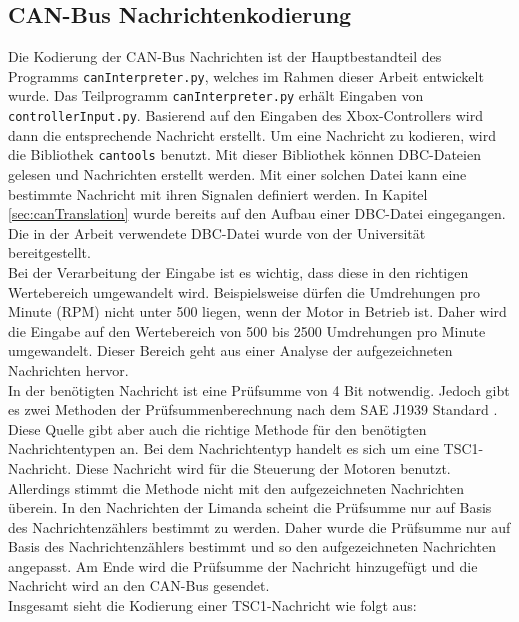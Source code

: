 \subsection{CAN-Bus Nachrichtenkodierung} \label{sec:canBus}
Die Kodierung der CAN-Bus Nachrichten ist der Hauptbestandteil des Programms \texttt{canInterpreter.py}, welches im Rahmen dieser Arbeit
entwickelt wurde. 
Das Teilprogramm \texttt{canInterpreter.py} erhält Eingaben von \texttt{controllerInput.py}. Basierend auf den
Eingaben des Xbox-Controllers wird dann die entsprechende Nachricht erstellt. Um eine Nachricht zu kodieren, wird die Bibliothek \texttt{cantools} benutzt.
Mit dieser Bibliothek können DBC-Dateien gelesen und Nachrichten erstellt werden. Mit einer solchen Datei kann eine
bestimmte Nachricht mit ihren Signalen definiert werden. In Kapitel \ref{sec:canTranslation} wurde bereits auf den
Aufbau einer DBC-Datei eingegangen. Die in der Arbeit verwendete DBC-Datei wurde von der Universität bereitgestellt. \\
Bei der Verarbeitung der Eingabe ist es wichtig, dass diese in den richtigen Wertebereich umgewandelt wird.
Beispielsweise dürfen die Umdrehungen pro Minute (RPM) nicht unter 500 liegen, wenn der Motor in Betrieb ist.
Daher wird die Eingabe auf den Wertebereich von 500 bis 2500 Umdrehungen pro Minute umgewandelt. Dieser Bereich
geht aus einer Analyse der aufgezeichneten Nachrichten hervor.
\\
In der benötigten Nachricht ist eine Prüfsumme von 4 Bit notwendig. Jedoch gibt es zwei Methoden der Prüfsummenberechnung
nach dem SAE J1939 Standard \cite{VectorSAE}. Diese Quelle gibt aber auch die richtige Methode für den benötigten Nachrichtentypen
an. Bei dem Nachrichtentyp handelt es sich um eine TSC1-Nachricht. Diese Nachricht wird für die Steuerung der Motoren
benutzt. Allerdings stimmt die Methode nicht mit den aufgezeichneten Nachrichten überein. In den Nachrichten der Limanda
scheint die Prüfsumme nur auf Basis des Nachrichtenzählers bestimmt zu werden. Daher wurde die Prüfsumme nur auf Basis des Nachrichtenzählers
bestimmt und so den aufgezeichneten Nachrichten angepasst.
Am Ende wird die Prüfsumme der Nachricht hinzugefügt und die
Nachricht wird an den CAN-Bus gesendet. \\
Insgesamt sieht die Kodierung einer TSC1-Nachricht wie folgt aus:

